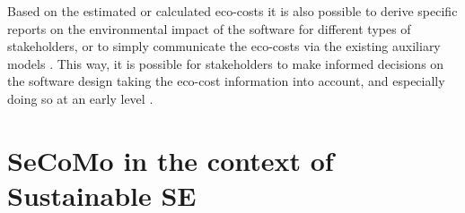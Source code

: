 \documentclass[oribibl]{llncs}
\begin{document}
Based on the estimated or calculated eco-costs it is also possible to derive specific reports on the environmental impact of the software for different types of stakeholders, or to simply communicate the eco-costs via the existing auxiliary models \cite{schulze_cost_2016}. This way, it is possible for stakeholders to make informed decisions on the software design taking the eco-cost information into account, and especially doing so at an early level \cite{schulze_cost_2016}.



\section{SeCoMo in the context of Sustainable SE}
\end{document}
